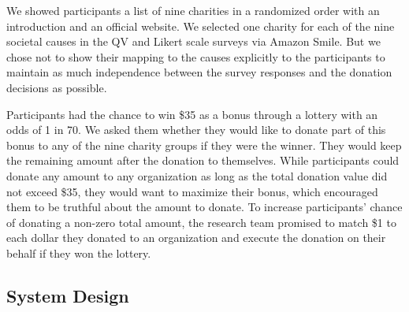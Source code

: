 We showed participants a list of nine charities in a randomized order with an introduction and an official website. We selected one charity for each of the nine societal causes in the QV and Likert scale surveys via Amazon Smile. But we chose not to show their mapping to the causes explicitly to the participants to maintain as much independence between the survey responses and the donation decisions as possible. 

Participants had the chance to win \$35 as a bonus through a lottery with an odds of 1 in 70. We asked them whether they would like to donate part of this bonus to any of the nine charity groups if they were the winner. They would keep the remaining amount after the donation to themselves. While participants could donate any amount to any organization as long as the total donation value did not exceed \$35, they would want to maximize their bonus, which encouraged them to be truthful about the amount to donate. To increase participants' chance of donating a non-zero total amount, the research team promised to match \$1 to each dollar they donated to an organization and execute the donation on their behalf if they won the lottery. 




\subsection{System Design}

